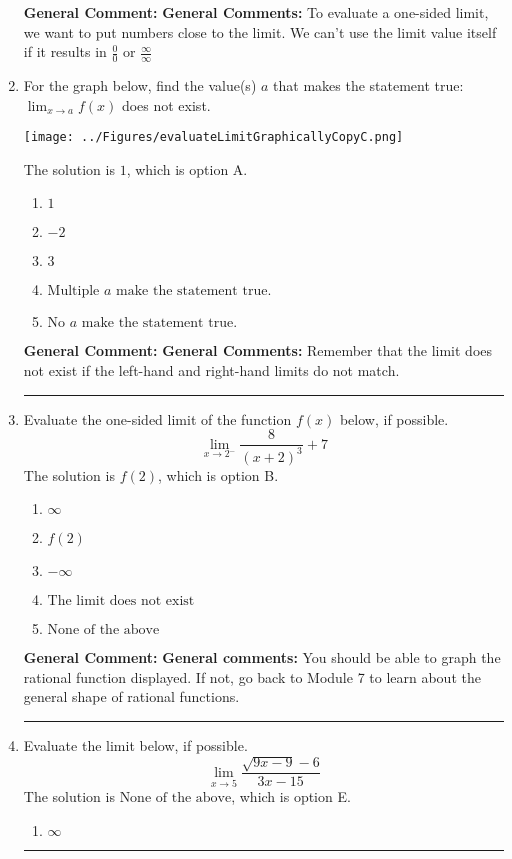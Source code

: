 \documentclass{extbook}[14pt]
\newcommand{\litem}[1]{\item #1

\rule{\textwidth}{0.4pt}}
\begin{document}
\begin{enumerate}
{\textbf{General Comment:} \textbf{General Comments:} To evaluate a one-sided limit, we want to put numbers close to the limit. We can't use the limit value itself if it results in $\frac{0}{0}$ or $\frac{\infty}{\infty}$
}
\litem{
For the graph below, find the value(s) $a$ that makes the statement true: $ \displaystyle \lim_{x \rightarrow a} f(x)$ does not exist.

\begin{center}
    \texttt{[image: ../Figures/evaluateLimitGraphicallyCopyC.png]}
\end{center}


The solution is \( 1 \), which is option A.\begin{enumerate}[label=\Alph*.]
\item \( 1 \)


\item \( -2 \)


\item \( 3 \)


\item \( \text{Multiple } a \text{ make the statement true}. \)


\item \( \text{No } a \text{ make the statement true}. \)


\end{enumerate}

\textbf{General Comment:} \textbf{General Comments:} Remember that the limit does not exist if the left-hand and right-hand limits do not match.
}
\litem{
Evaluate the one-sided limit of the function $f(x)$ below, if possible.
\[ \lim_{x \rightarrow 2^-} \frac{8}{(x+2)^3}+7 \]The solution is \( f(2) \), which is option B.\begin{enumerate}[label=\Alph*.]
\item \( \infty \)


\item \( f(2) \)


\item \( -\infty \)


\item \( \text{The limit does not exist} \)


\item \( \text{None of the above} \)


\end{enumerate}

\textbf{General Comment:} \textbf{General comments:} You should be able to graph the rational function displayed. If not, go back to Module 7 to learn about the general shape of rational functions.
}
\litem{
Evaluate the limit below, if possible.
\[ \lim_{x \rightarrow 5} \frac{\sqrt{9x - 9} - 6}{3x - 15} \]The solution is \( \text{None of the above} \), which is option E.\begin{enumerate}[label=\Alph*.]
\item \( \infty \)


\end{enumerate}}
\end{enumerate}
\end{document}
